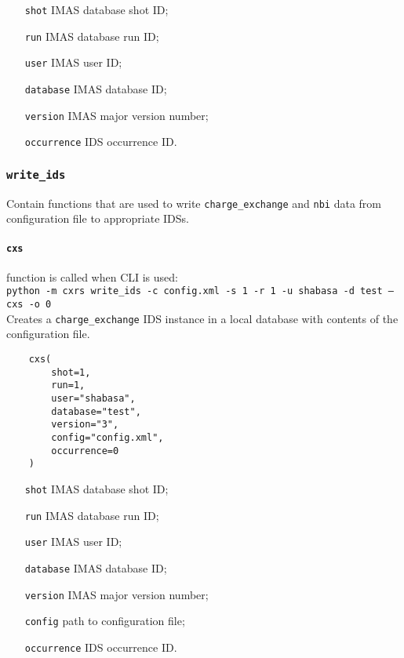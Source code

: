 \documentclass[../../main]{subfiles}
\begin{document}
\begin{itemize}[align=left]
    \item[\texttt{shot}] IMAS database shot ID;
    \item[\texttt{run}] IMAS database run ID;
    \item[\texttt{user}] IMAS user ID;
    \item[\texttt{database}] IMAS database ID;
    \item[\texttt{version}] IMAS major version number;
    \item[\texttt{occurrence}] IDS occurrence ID.
\end{itemize}

\subsubsection{\texttt{write\_ids}}

Contain functions that are used to write \texttt{charge\_exchange} and \texttt{nbi} data from configuration file to appropriate IDSs.

\paragraph{\texttt{cxs}} function is called when CLI is used:\\
\texttt{python -m cxrs write_ids -c config.xml -s 1 -r 1 -u shabasa -d test --cxs -o 0}\\
Creates a \texttt{charge\_exchange} IDS instance in a local database with contents of the configuration file.

\begin{verbatim}
    cxs(
        shot=1,
        run=1,
        user="shabasa",
        database="test",
        version="3",
        config="config.xml",
        occurrence=0
    )
\end{verbatim}

\begin{itemize}[align=left]
    \item[\texttt{shot}] IMAS database shot ID;
    \item[\texttt{run}] IMAS database run ID;
    \item[\texttt{user}] IMAS user ID;
    \item[\texttt{database}] IMAS database ID;
    \item[\texttt{version}] IMAS major version number;
    \item[\texttt{config}] path to configuration file;
    \item[\texttt{occurrence}] IDS occurrence ID.
\end{itemize}
\end{document}
